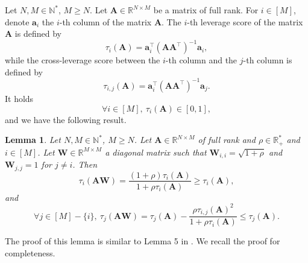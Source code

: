 \documentclass[twoside,11pt]{book}
\newtheorem{lemma}{Lemma}
\numberwithin{theorem}{chapter}
\numberwithin{definition}{chapter}
\numberwithin{proposition}{chapter}
\numberwithin{corollary}{chapter}
\numberwithin{example}{chapter}
\numberwithin{lemma}{chapter}
\numberwithin{assumption}{chapter}
\numberwithin{equation}{chapter}
\numberwithin{figure}{chapter}
\DeclareMathOperator{\Tran}{\intercal}
\begin{document}
Let $N,M \in \mathbb{N}^{*}$, $M \geq N$. Let $\bm{A} \in \mathbb{R}^{N \times M}$ be a matrix of full rank.
For $i \in [M]$, denote $\bm{a}_{i}$ the $i$-th column of the matrix $\bm{A}$. The $i$-th leverage score of the matrix $\bm{A}$ is defined by
\begin{equation}\label{eq:def_matrix_leverage_score}
\tau_{i}(\bm{A}) = \bm{a}_{i}^{\Tran} (\bm{A}\bm{A}^{\Tran})^{-1}\bm{a}_{i},
\end{equation}
while the cross-leverage score between the $i$-th column and the $j$-th column is defined by
\begin{equation}
\tau_{i,j}(\bm{A}) = \bm{a}_{i}^{\Tran} (\bm{A}\bm{A}^{\Tran})^{-1}\bm{a}_{j}.
\end{equation}
It holds \citep{DrMaMu06}
\begin{equation}\label{eq:bounds_on_lv_scores}
\forall i \in [M], \: \tau_{i}(\bm{A}) \in [0,1],
\end{equation}
and we have the following result.
\begin{lemma}\label{lemma:rank1_leverage_score}
Let $N,M \in \mathbb{N}^{*}$, $M \geq N$. Let $\bm{A} \in \mathbb{R}^{N \times M}$ of full rank and $\rho \in \mathbb{R}_{+}^{*}$ and $i \in [M]$. Let $\bm{W} \in \mathbb{R}^{M \times M}$ a diagonal matrix such that $\bm{W}_{i,i} = \sqrt{1+\rho}$ and $\bm{W}_{j,j} = 1$ for $j \neq i$. Then
\begin{equation}\label{eq:lv_score_update}
\tau_{i}(\bm{A}\bm{W}) = \frac{(1+\rho)\tau_{i}(\bm{A})}{1+\rho \tau_{i}(\bm{A})} \geq \tau_{i}(\bm{A}),
\end{equation}
and
\begin{equation}\label{eq:cross_lv_score_update}
\forall j \in [M]-\{i\}, \: \tau_{j}(\bm{A}\bm{W}) = \tau_{j}(\bm{A}) -\frac{\rho \tau_{i,j}(\bm{A})^{2}}{1+\rho \tau_{i}(\bm{A})} \leq \tau_{j}(\bm{A}).
\end{equation}
\end{lemma}
The proof of this lemma is similar to Lemma 5 in \cite{Coh15}. We recall the proof for completeness.
\end{document}
